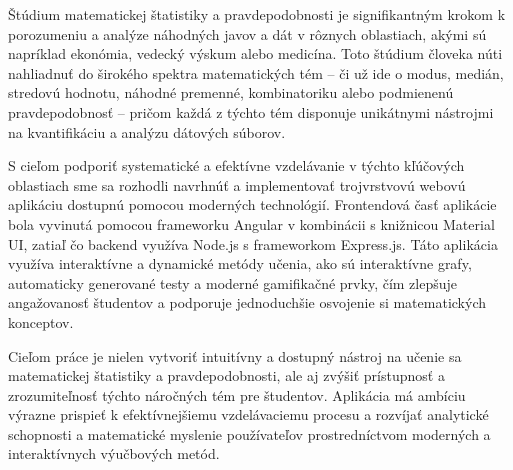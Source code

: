 Štúdium matematickej štatistiky a pravdepodobnosti je signifikantným krokom k porozumeniu a analýze náhodných javov a dát v rôznych oblastiach, akými sú napríklad ekonómia, vedecký výskum alebo medicína.
Toto štúdium človeka núti nahliadnuť do širokého spektra matematických tém – či už ide o modus, medián, stredovú hodnotu, náhodné premenné, kombinatoriku alebo podmienenú pravdepodobnosť – pričom každá z týchto tém disponuje unikátnymi nástrojmi na kvantifikáciu a analýzu dátových súborov.

S cieľom podporiť systematické a efektívne vzdelávanie v týchto kľúčových oblastiach sme sa rozhodli navrhnúť a implementovať trojvrstvovú webovú aplikáciu dostupnú pomocou moderných technológií.
Frontendová časť aplikácie bola vyvinutá pomocou frameworku Angular v kombinácii s knižnicou Material UI, zatiaľ čo backend využíva Node.js s frameworkom Express.js.
Táto aplikácia využíva interaktívne a dynamické metódy učenia, ako sú interaktívne grafy, automaticky generované testy a moderné gamifikačné prvky, čím zlepšuje angažovanosť študentov a podporuje jednoduchšie osvojenie si matematických konceptov.

Cieľom práce je nielen vytvoriť intuitívny a dostupný nástroj na učenie sa matematickej štatistiky a pravdepodobnosti, ale aj zvýšiť prístupnosť a zrozumiteľnosť týchto náročných tém pre študentov. 
Aplikácia má ambíciu výrazne prispieť k efektívnejšiemu vzdelávaciemu procesu a rozvíjať analytické schopnosti a matematické myslenie používateľov prostredníctvom moderných a interaktívnych výučbových metód.